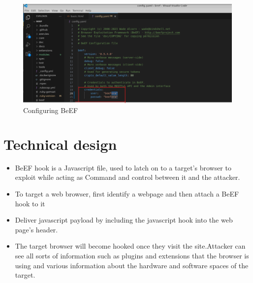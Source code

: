 \documentclass{report}
\begin{document}
\begin{figure}[h]
    \centering
    \includegraphics[width=1.0\textwidth]{Installation/install3.png}
    \caption{Configuring BeEF}
    \label{fig:}
\end{figure}

\clearpage



\chapter{Technical design}
\begin{itemize}
    \item BeEF hook is a Javascript file, used to latch on to a target’s browser to exploit while acting as Command and control between it and the attacker.
    \item To target a web browser, first identify a webpage and then attach a BeEF hook to it
    \item Deliver javascript payload by including the javascript hook into the web page’s header.         
    \item The target browser will become hooked once they visit the site.Attacker can see all sorts of information such as plugins and extensions that the browser is using and various information about the hardware and software spaces of the target.

\end{itemize}
\end{document}
